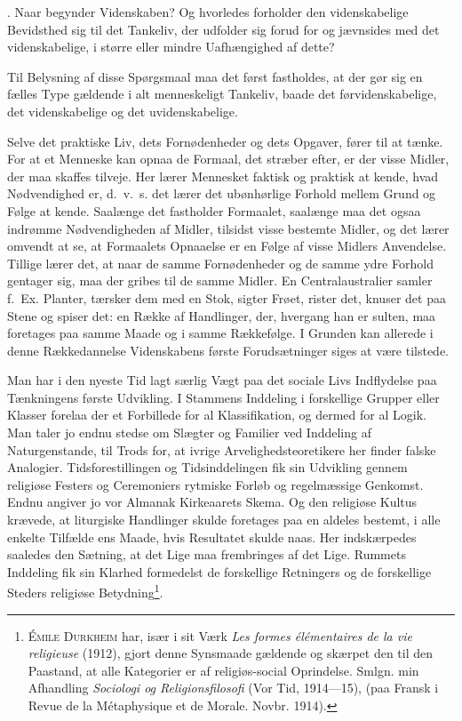 \documentclass[12pt]{article}
\newcommand{\opage}[1]{\marginnote{\footnotesize\textit{[#1]}}}
\begin{document}
. Naar begynder Videnskaben? Og hvorledes forholder den videnskabelige
Bevidsthed sig til det Tankeliv, der udfolder sig forud for og jævnsides med det
videnskabelige, i større eller mindre Uafhængighed af dette?

Til Belysning af disse Spørgsmaal maa det først fastholdes, at der gør sig en
fælles Type gældende i alt menneskeligt Tankeliv, baade det førvidenskabelige,
det videnskabelige og det uvidenskabelige.

Selve det praktiske Liv, dets Fornødenheder og dets Opgaver, fører til at
tænke. For at et Menneske kan opnaa de Formaal, det stræber efter, er der visse
Midler, der maa skaffes tilveje. Her lærer Mennesket faktisk og praktisk at
kende, hvad Nødvendighed er, d.~v.~s. det lærer det ubønhørlige Forhold mellem
Grund og Følge at kende. Saalænge det fastholder Formaalet, saalænge maa det
ogsaa indrømme Nødvendigheden af Midler, tilsidst visse bestemte Midler, og det
lærer omvendt at se, at Formaalets Opnaaelse er en Følge af visse Midlers
Anvendelse. Tillige lærer det, at naar de samme Fornødenheder og de samme ydre
Forhold gentager sig, maa der gribes til de samme Midler. En Centralaustralier
samler f.~Ex. Planter, tærsker dem med en Stok, sigter Frøet, rister det, knuser
det paa Stene og spiser det: en Række af Handlinger, der, hvergang han er
sulten, maa foretages
\setcounter{footnote}{0}%
\opage{5}paa samme Maade og i samme Rækkefølge. I Grunden kan allerede i denne
Rækkedannelse Videnskabens første Forudsætninger siges at være tilstede.

Man har i den nyeste Tid lagt særlig Vægt paa det sociale Livs Indflydelse paa
Tænkningens første Udvikling. I Stammens Inddeling i forskellige Grupper eller
Klasser forelaa der et Forbillede for al Klassifikation, og dermed for al Logik.
Man taler jo endnu stedse om Slægter og Familier ved Inddeling af
Naturgenstande, til Trods for, at ivrige Arvelighedsteoretikere her finder
falske Analogier. Tidsforestillingen og Tidsinddelingen fik sin Udvikling gennem
religiøse Festers og Ceremoniers rytmiske Forløb og regelmæssige Genkomst.
Endnu angiver jo vor Almanak Kirkeaarets Skema. Og den religiøse Kultus krævede,
at liturgiske Handlinger skulde foretages paa en aldeles bestemt, i alle
enkelte Tilfælde ens Maade, hvis Resultatet skulde naas. Her indskærpedes
saaledes den Sætning, at det Lige maa frembringes af det Lige. Rummets
Inddeling fik sin Klarhed formedelst de forskellige Retningers og de
forskellige Steders religiøse Betydning\footnote{\textsc{Émile Durkheim} har,
især i sit Værk \textit{Les formes élémentaires de la vie religieuse} (1912),
gjort denne Synsmaade gældende og skærpet den til den Paastand, at alle
Kategorier er af religiøs-social Oprindelse. Smlgn. min Afhandling
\textit{Sociologi og Religionsfilosofi} (Vor Tid, 1914---15), (paa Fransk i
Revue de la Métaphysique et de Morale. Novbr. 1914).}.
\end{document}
